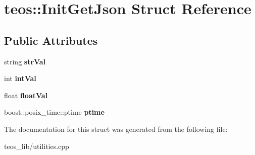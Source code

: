 \hypertarget{structteos_1_1_init_get_json}{}\section{teos\+:\+:Init\+Get\+Json Struct Reference}
\label{structteos_1_1_init_get_json}
\subsection*{Public Attributes}
\begin{DoxyCompactItemize}
\item 
\mbox{\label{structteos_1_1_init_get_json_ae52964bccbe6d0f23f0e01586a8855b9}} 
string {\bfseries str\+Val}
\item 
\mbox{\label{structteos_1_1_init_get_json_ae86e224b84a021705317a0cf3e788f1f}} 
int {\bfseries int\+Val}
\item 
\mbox{\label{structteos_1_1_init_get_json_a30a13c796a6829e1b9ec711519012d64}} 
float {\bfseries float\+Val}
\item 
\mbox{\label{structteos_1_1_init_get_json_a01c32cb0438e072c44cf5206ef0075d0}} 
boost\+::posix\+\_\+time\+::ptime {\bfseries ptime}
\end{DoxyCompactItemize}


The documentation for this struct was generated from the following file\+:\begin{DoxyCompactItemize}
\item 
teos\+\_\+lib/utilities.\+cpp\end{DoxyCompactItemize}
